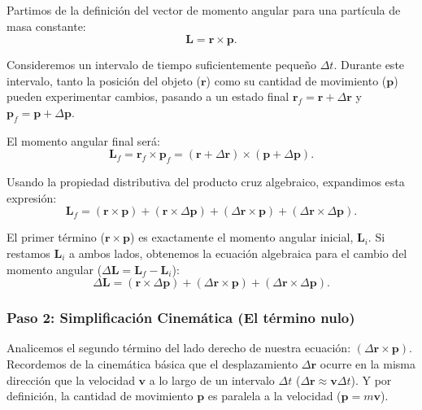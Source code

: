 \documentclass[11pt,a4paper]{book}
\begin{document}
Partimos de la definición del vector de momento angular para una partícula de masa constante:
\begin{equation}
    \boldsymbol{L} = \boldsymbol{r} \times \boldsymbol{p}.
\end{equation}

Consideremos un intervalo de tiempo suficientemente pequeño $\Delta t$. Durante este intervalo, tanto la posición del objeto ($\boldsymbol{r}$) como su cantidad de movimiento ($\boldsymbol{p}$) pueden experimentar cambios, pasando a un estado final $\boldsymbol{r}_f = \boldsymbol{r} + \Delta\boldsymbol{r}$ y $\boldsymbol{p}_f = \boldsymbol{p} + \Delta\boldsymbol{p}$.

El momento angular final será:
\begin{equation}
    \boldsymbol{L}_f = \boldsymbol{r}_f \times \boldsymbol{p}_f = (\boldsymbol{r} + \Delta\boldsymbol{r}) \times (\boldsymbol{p} + \Delta\boldsymbol{p}).
\end{equation}

Usando la propiedad distributiva del producto cruz algebraico, expandimos esta expresión:
\begin{equation}
    \boldsymbol{L}_f = (\boldsymbol{r} \times \boldsymbol{p}) + (\boldsymbol{r} \times \Delta\boldsymbol{p}) + (\Delta\boldsymbol{r} \times \boldsymbol{p}) + (\Delta\boldsymbol{r} \times \Delta\boldsymbol{p}).
\end{equation}

El primer término ($\boldsymbol{r} \times \boldsymbol{p}$) es exactamente el momento angular inicial, $\boldsymbol{L}_i$. Si restamos $\boldsymbol{L}_i$ a ambos lados, obtenemos la ecuación algebraica para el cambio del momento angular ($\Delta \boldsymbol{L} = \boldsymbol{L}_f - \boldsymbol{L}_i$):
\begin{equation}
    \Delta \boldsymbol{L} = (\boldsymbol{r} \times \Delta\boldsymbol{p}) + (\Delta\boldsymbol{r} \times \boldsymbol{p}) + (\Delta\boldsymbol{r} \times \Delta\boldsymbol{p}).
    \label{eq:delta_L_algebraico}
\end{equation}

\subsubsection{Paso 2: Simplificación Cinemática (El término nulo)}

Analicemos el segundo término del lado derecho de nuestra ecuación: $(\Delta\boldsymbol{r} \times \boldsymbol{p})$.
Recordemos de la cinemática básica que el desplazamiento $\Delta\boldsymbol{r}$ ocurre en la misma dirección que la velocidad $\boldsymbol{v}$ a lo largo de un intervalo $\Delta t$ ($\Delta\boldsymbol{r} \approx \boldsymbol{v}\Delta t$). Y por definición, la cantidad de movimiento $\boldsymbol{p}$ es paralela a la velocidad ($\boldsymbol{p} = m\boldsymbol{v}$).
\end{document}
